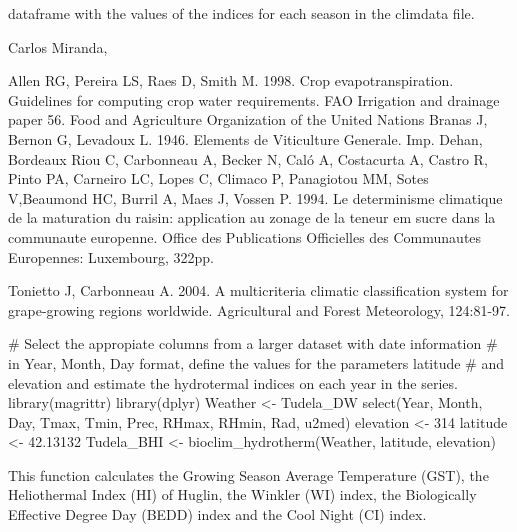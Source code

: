 \documentclass[a4paper]{book}
\begin{document}
%
\begin{Value}
dataframe with the values of the indices for each season in the
climdata file.
\end{Value}
%
\begin{Author}\relax
Carlos Miranda, 
\end{Author}
%
\begin{References}\relax
Allen RG, Pereira LS, Raes D, Smith M. 1998. Crop evapotranspiration. Guidelines
for computing crop water requirements. FAO Irrigation and drainage paper 56. Food 
and Agriculture Organization of the United Nations
Branas J, Bernon G, Levadoux L. 1946. Elements de Viticulture Generale. 
Imp. Dehan, Bordeaux
Riou C, Carbonneau A, Becker N, Caló A, Costacurta A, Castro R, Pinto PA, 
Carneiro LC, Lopes C, Climaco P, Panagiotou MM, Sotes V,Beaumond HC, Burril A, 
Maes J, Vossen P. 1994. Le determinisme climatique de la maturation du raisin: 
application au zonage de la teneur em sucre dans la communaute europenne. 
Office des Publications Officielles des Communautes Europennes: Luxembourg, 322pp.

Tonietto J, Carbonneau A. 2004. A multicriteria climatic classification system 
for grape-growing regions worldwide. Agricultural and Forest Meteorology, 124:81-97.
\end{References}
%
\begin{Examples}
\begin{ExampleCode}

# Select the appropiate columns from a larger dataset with date information
# in Year, Month, Day format, define the values for the parameters latitude 
# and elevation and estimate the hydrotermal indices on each year in the series.
library(magrittr)
library(dplyr)
Weather <- Tudela_DW %
   select(Year, Month, Day, Tmax, Tmin, Prec, RHmax, RHmin, Rad, u2med)
elevation <- 314
latitude <- 42.13132
Tudela_BHI <- bioclim_hydrotherm(Weather, latitude, elevation)

\end{ExampleCode}
\end{Examples}
%
\begin{Description}\relax
This function calculates the Growing Season Average Temperature (GST), the
Heliothermal Index (HI) of Huglin, the Winkler (WI) index, the Biologically
Effective Degree Day (BEDD) index and the Cool Night (CI) index.
\end{Description}
\end{document}
